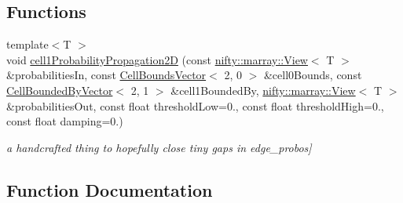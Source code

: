 \subsection*{Functions}
\begin{DoxyCompactItemize}
\item 
{\footnotesize template$<$T $>$ }\\void \hyperlink{namespacenifty_1_1cgp_a843b0dda23907002418edcd4765cdae1}{cell1\+Probability\+Propagation2\+D} (const \hyperlink{classandres_1_1View}{nifty\+::marray\+::\+View}$<$ T $>$ \&probabilities\+In, const \hyperlink{classnifty_1_1cgp_1_1CellBoundsVector}{Cell\+Bounds\+Vector}$<$ 2, 0 $>$ \&cell0\+Bounds, const \hyperlink{classnifty_1_1cgp_1_1CellBoundedByVector}{Cell\+Bounded\+By\+Vector}$<$ 2, 1 $>$ \&cell1\+Bounded\+By, \hyperlink{classandres_1_1View}{nifty\+::marray\+::\+View}$<$ T $>$ \&probabilities\+Out, const float threshold\+Low=0., const float threshold\+High=0., const float damping=0.)
\begin{DoxyCompactList}\small\item\em a handcrafted thing to hopefully close tiny gaps in edge\+\_\+probos\mbox{]} \end{DoxyCompactList}\end{DoxyCompactItemize}


\subsection{Function Documentation}
\hypertarget{namespacenifty_1_1cgp_a843b0dda23907002418edcd4765cdae1}{}
